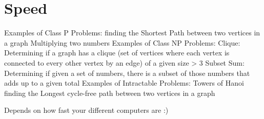 \chapter{Speed} %

\begin{exercises}
\begin{ex}%
Examples of Class P Problems:
finding the Shortest Path between two vertices in a graph
Multiplying two numbers
Examples of Class NP Problems:
Clique: Determining if a graph has a clique (set of vertices where each
vertex is connected to every other vertex by an edge) of a given size > 3
Subset Sum: Determining if given a set of numbers, there is a subset of
those numbers that adds up to a given total
Examples of Intractable Problems:
Towers of Hanoi
finding the Longest cycle-free path between two vertices in a graph
\end{ex}

\begin{ex}%
Depends on how fast your different computers are :)
\end{ex}

\end{exercises}
